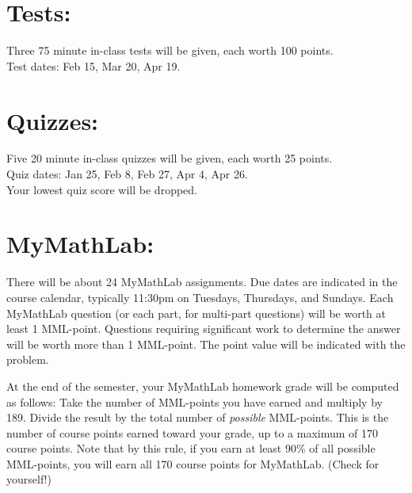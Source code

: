 \documentclass[11pt]{article}
\begin{document}
\vspace{0.5cm}


\section{\textbf{Tests:}}
\vspace{-.65cm}
\hangindent=5cm 
Three 75 minute in-class tests will be given, each worth 100 points.\\
Test dates: Feb 15, Mar 20, Apr 19.

\vspace{0.5cm}


\section{\textbf{Quizzes:}}
\vspace{-.65cm}
\hangindent=5cm 
Five 20 minute in-class quizzes will be given, each worth 25 points.\\
Quiz dates: Jan 25, Feb 8, Feb 27, Apr 4, Apr 26.\\
Your lowest quiz score will be dropped.

\vspace{0.5cm}


\section{\textbf{MyMathLab:}}
\vspace{-.65cm}
\hangindent=5cm 
There will be about 24 MyMathLab assignments.
Due dates are indicated in the course calendar, typically 11:30pm on Tuesdays, Thursdays, and Sundays.
Each MyMathLab question (or each part, for multi-part questions) will be worth at least 1 MML-point.
Questions requiring significant work to determine the answer will be worth more than 1 MML-point.
The point value will be indicated with the problem.

\hangindent=5cm 
At the end of the semester, your MyMathLab homework grade will be computed as follows:  Take the number of MML-points you have earned and multiply by 189.  Divide the result by the total number of \textit{possible} MML-points.  This is the number of course points earned toward your grade, up to a maximum of 170 course points.
Note that by this rule, if you earn at least 90\% of all possible MML-points, you will earn all 170 course points for MyMathLab.  (Check for yourself!)
\end{document}

